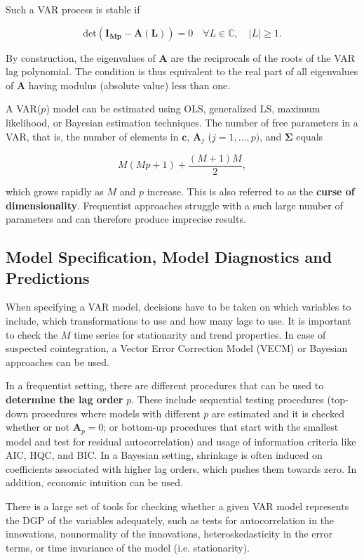 Such a VAR process is stable if

\[
	\mathrm{det}(\bm{I}_{\bm{Mp}}-\bm{A}(\bm{L})) = 0 \quad \forall L \in \mathbb{C}, \quad |L|\geq 1.
\]

By construction, the eigenvalues of $\bm{A}$ are the reciprocals of the roots of the VAR lag polynomial. The condition is thus equivalent to the real part of all eigenvalues of $\bm{A}$ having modulus (absolute value) less than one. 

A VAR($p$) model can be estimated using OLS, generalized LS, maximum likelihood, or Bayesian estimation techniques. The number of free parameters in a VAR, that is, the number of elements in $\bm{c}$, $\bm{A}_j$ ($j = 1,\dots,p)$, and $\bm{\Sigma}$ equals

\[
	M(Mp+1) + \frac{(M+1)M}{2},
\]

which grows rapidly as $M$ and $p$ increase. This is also referred to as the \textbf{curse of dimensionality}. Frequentist approaches struggle with a such large number of parameters and can therefore produce imprecise results.


\subsection{Model Specification, Model Diagnostics and Predictions}

When specifying a VAR model, decisions have to be taken on which variables to include, which transformations to use and how many lags to use. It is important to check the $M$ time series for stationarity and trend properties. In case of suspected cointegration, a Vector Error Correction Model (VECM) or Bayesian approaches can be used. 

In a frequentist setting, there are different procedures that can be used to \textbf{determine the lag order} $p$. These include sequential testing procedures (top-down procedures where models with different $p$ are estimated and it is checked whether or not $\bm{A}_p=0$;  or bottom-up procedures that start with the smallest model and test for residual autocorrelation) and usage of information criteria like AIC, HQC, and BIC. In a Bayesian setting, shrinkage is often induced on coefficients associated with higher lag orders, which pushes them towards zero. In addition, economic intuition can be used.

There is a large set of tools for checking whether a given VAR model represents the DGP of the variables adequately, such as tests for autocorrelation in the innovations, nonnormality of the innovations, heteroskedasticity in the error terms, or time invariance of the model (i.e. stationarity).

